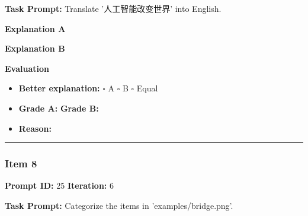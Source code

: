 \documentclass[11pt]{article}
\begin{document}
\textbf{Task Prompt:} Translate '人工智能改变世界' into English.

\vspace{0.75em}
\noindent
\begin{minipage}[t]{0.48\textwidth}
\textbf{Explanation A}

\vspace{0.5em}
\end{minipage}
\hfill
\begin{minipage}[t]{0.48\textwidth}
\textbf{Explanation B}

\vspace{0.5em}
\end{minipage}

\vspace{1em}

\textbf{Evaluation}
\begin{itemize}
    \item \textbf{Better explanation:} \hspace{1em} $\square$ A \hspace{1em} $\square$ B \hspace{1em} $\square$ Equal
    \item \textbf{Grade A:} \underline{\hspace{2cm}} \hspace{1em} \textbf{Grade B:} \underline{\hspace{2cm}}
    \item \textbf{Reason:} \\[4.5em]
\end{itemize}

\vspace{1em}
\hrule
\vspace{1em}


\subsubsection*{Item 8}
\textbf{Prompt ID:} 25 \hfill \textbf{Iteration:} 6

\textbf{Task Prompt:} Categorize the items in 'examples/bridge.png'.
\end{document}
